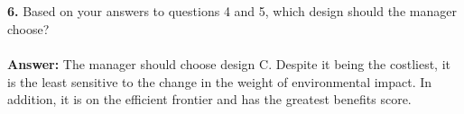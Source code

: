 \documentclass[12pt]{article}
\begin{document}
\\~\\
\textbf{6.} Based on your answers to questions 4 and 5, which design should the manager choose? \\~\\
\textbf{Answer:} The manager should choose design C. Despite it being the costliest, it is the least sensitive to the change in the weight of environmental impact. In addition, it is on the efficient frontier and has the greatest benefits score. 
\end{document}
